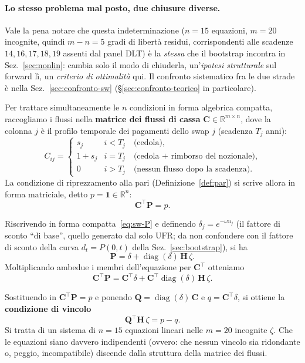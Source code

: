 \documentclass[11pt,a4paper]{article}
\theoremstyle{plain}
\theoremstyle{definition}
\theoremstyle{remark}
\newcommand{\UFR}{\mathrm{UFR}}
\newcommand{\Qmat}{\mathbf{Q}}
\newcommand{\Hmat}{\mathbf{H}}
\newcommand{\transp}{^{\!\top}}
\begin{document}
\paragraph{Lo stesso problema mal posto, due chiusure diverse.}
Vale la pena notare che questa indeterminazione ($n=15$ equazioni, $m=20$ incognite, quindi
$m-n=5$ gradi di libert\`a residui, corrispondenti alle scadenze $14,16,17,18,19$ assenti dal
panel DLT) \`e la \emph{stessa} che il bootstrap incontra in Sez.~\ref{sec:nonlin}: cambia
solo il modo di chiuderla, un'\emph{ipotesi strutturale} sul forward l\`i, un
\emph{criterio di ottimalit\`a} qui. Il confronto sistematico fra le due strade \`e nella
Sez.~\ref{sec:confronto-sw} (\S\ref{sec:confronto-teorico} in particolare).

Per trattare simultaneamente le $n$ condizioni in forma algebrica compatta, raccogliamo i
flussi nella \textbf{matrice dei flussi di cassa} $\mathbf{C}\in\mathbb{R}^{m\times n}$,
dove la colonna $j$ \`e il profilo temporale dei pagamenti dello swap $j$ (scadenza $T_j$ anni):
\[
  C_{ij} =
  \begin{cases}
    s_j     & i < T_j \quad\text{(cedola),}\\
    1 + s_j & i = T_j \quad\text{(cedola + rimborso del nozionale),}\\
    0        & i > T_j \quad\text{(nessun flusso dopo la scadenza).}
  \end{cases}
\]
La condizione di riprezzamento alla pari (Definizione~\ref{def:par}) si scrive allora in forma
matriciale, detto $p = \mathbf{1} \in \mathbb{R}^n$:
\[
  \mathbf{C}\transp \mathbf{P} = p .
\]

Riscrivendo in forma compatta~\eqref{eq:sw-P} e definendo $\delta_j = e^{-\omega u_j}$ (il
fattore di sconto ``di base'', quello generato dal solo $\UFR$; da non confondere con il
fattore di sconto della curva $d_t = P(0,t)$ della Sez.~\ref{sec:bootstrap}), si ha
\[
  \mathbf{P} = \delta + \operatorname{diag}(\delta)\,\Hmat\,\zeta .
\]
Moltiplicando ambedue i membri dell'equazione per $\mathbf{C}\transp$ otteniamo
\[
  \mathbf{C}\transp \mathbf{P} = \mathbf{C}\transp \delta + \mathbf{C}\transp \operatorname{diag}(\delta)\,\Hmat\,\zeta .
\]

Sostituendo in $\mathbf{C}\transp \mathbf{P} = p$ e ponendo
$\Qmat = \operatorname{diag}(\delta)\,\mathbf{C}$ e $q = \mathbf{C}\transp \delta$, si ottiene la
\textbf{condizione di vincolo}
\begin{equation}
  \Qmat\transp \Hmat\, \zeta = p - q .
  \label{eq:vincolo}
\end{equation}
Si tratta di un sistema di $n=15$ equazioni lineari nelle $m=20$ incognite $\zeta$. Che le
equazioni siano davvero indipendenti (ovvero: che nessun vincolo sia ridondante o, peggio,
incompatibile) discende dalla struttura della matrice dei flussi.
\end{document}
